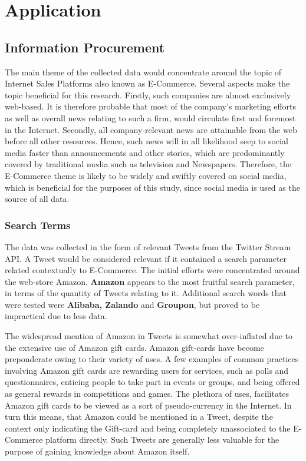 \section{Application}
\label{Application}
	\subsection{Information Procurement}
	The main theme of the collected data would concentrate around the topic of Internet Sales Platforms also known as E-Commerce. Several aspects make the topic beneficial for this research. Firstly,  such companies are almost exclusively web-based. It is therefore probable that most of the company's marketing efforts as well as overall news relating to such a firm, would circulate first and foremost in the Internet. Secondly, all company-relevant news are attainable from the web before all other resources. Hence, such news will in all likelihood seep to social media faster than announcements and other stories, which are predominantly covered by traditional media such as television and Newspapers. Therefore, the E-Commerce theme is likely to be widely and swiftly covered on social media, which is beneficial for the purposes of this study, since social media is used as the source of all data.
	
		\subsubsection*{Search Terms}
			The data was collected in the form of relevant Tweets from the Twitter Stream API. A Tweet would be considered relevant if it contained a search parameter related contextually to E-Commerce. The initial efforts were concentrated around the web-store Amazon. \textbf{Amazon} appears to the most fruitful search parameter, in terms of the quantity of Tweets relating to it. Additional search words that were tested were {\bfseries Alibaba, Zalando} and {\bfseries Groupon}, but proved to be impractical due to less data. 
			
			\par
			
			The widespread mention of Amazon in Tweets is somewhat over-inflated due to the extensive use of Amazon gift cards. Amazon gift-cards have become preponderate owing to their variety of uses. A few examples of common practices involving Amazon gift cards are rewarding users for services, such as polls and questionnaires, enticing people to take part in events or groups, and being offered as general rewards in competitions and games. The plethora of uses, facilitates Amazon gift cards to be viewed as a sort of pseudo-currency in the Internet. In turn this means, that Amazon could be mentioned in a Tweet, despite the context only indicating the Gift-card and being completely unassociated to the E-Commerce platform directly. Such Tweets are generally less valuable for the purpose of gaining knowledge about Amazon itself.
		
